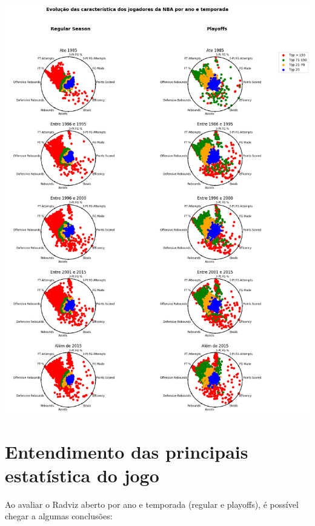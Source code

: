 \documentclass[
]{book}
\begin{document}
\includegraphics{imagens/14.png}

\hypertarget{entendimento-das-principais-estatuxedstica-do-jogo}{%
\chapter{Entendimento das principais estatística do jogo}\label{entendimento-das-principais-estatuxedstica-do-jogo}}

Ao avaliar o Radviz aberto por ano e temporada (regular e playoffs), é possível chegar a algumas conclusões:
\end{document}
